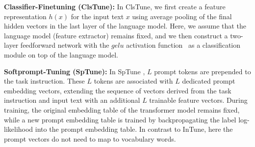 \documentclass[11pt]{article}
\begin{document}

\textbf{Classifier-Finetuning (ClsTune):} In ClsTune, we first create a feature representation $h(x)$ for the input text $x$ using average pooling of the final hidden vectors in the last layer of the language model. Here, we assume that the language model (feature extractor) remains fixed, and we then construct a two-layer feedforward network with the $gelu$ activation function~\cite{DBLP:journals/corr/HendrycksG16} as a classification module on top of the language model. 

\textbf{Softprompt-Tuning (SpTune):} In SpTune \cite{lester-etal-2021-power}, $L$ prompt tokens are prepended to the task instruction. These $L$ tokens are associated with $L$ dedicated prompt embedding vectors, extending the sequence of vectors derived from the task instruction and input text with an additional $L$ trainable feature vectors. During training, the original embedding table of the transformer model remains fixed, while a new prompt embedding table is trained by backpropagating the label log-likelihood into the prompt embedding table. In contrast to InTune, here the prompt vectors do not need to map to vocabulary words.

\end{document}
